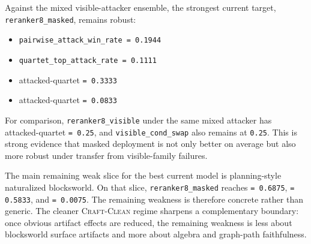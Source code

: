 Against the mixed visible-attacker ensemble, the strongest current target,
\texttt{reranker8\_masked}, remains robust:
\begin{itemize}[leftmargin=1.5em]
\item \texttt{pairwise\_attack\_win\_rate = 0.1944}
\item \texttt{quartet\_top\_attack\_rate = 0.1111}
\item attacked-quartet \selectiongain{} \texttt{= 0.3333}
\item attacked-quartet \exploitability{} \texttt{= 0.0833}
\end{itemize}
For comparison, \texttt{reranker8\_visible} under the same mixed attacker has
attacked-quartet \exploitability{} \texttt{= 0.25}, and
\texttt{visible\_cond\_swap} also remains at \texttt{0.25}. This is strong
evidence that masked deployment is not only better on average but also more
robust under transfer from visible-family failures.

The main remaining weak slice for the best current model is planning-style
naturalized blocksworld. On that slice, \texttt{reranker8\_masked} reaches
\auroc{} \texttt{= 0.6875}, \amcd{} \texttt{= 0.5833}, and \asstotal{}
\texttt{= 0.0075}. The remaining weakness is therefore concrete rather than
generic. The cleaner \textsc{Craft-Clean} regime sharpens a complementary
boundary: once obvious artifact effects are reduced, the remaining weakness is
less about blocksworld surface artifacts and more about algebra and graph-path
faithfulness.
